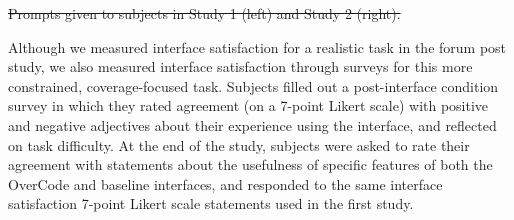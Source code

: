 \documentclass[12pt,twoside]{mitthesis}
\providecommand{\DIFaddtex}[1]{{\protect\color{blue}\uwave{#1}}} %
\providecommand{\DIFdeltex}[1]{{\protect\color{red}\sout{#1}}}                      %
\providecommand{\DIFaddbegin}{} %
\providecommand{\DIFaddend}{} %
\providecommand{\DIFdelbegin}{} %
\providecommand{\DIFdelend}{} %
\providecommand{\DIFdelFL}[1]{\DIFdel{#1}} %
\providecommand{\DIFadd}[1]{\texorpdfstring{\DIFaddtex{#1}}{#1}} %
\providecommand{\DIFdel}[1]{\texorpdfstring{\DIFdeltex{#1}}{}} %
\begin{document}
\DIFdelbegin %
{%
\DIFdelFL{Prompts given to subjects in Study 1 (left) and Study 2 (right).}}

\DIFdelend \DIFaddbegin {\bf \DIFadd{Surveys}} \DIFaddend Although we measured interface satisfaction for a realistic task in the forum post study, we also measured interface satisfaction through surveys for this more constrained, coverage-focused task. Subjects filled out a post-interface condition survey in which they rated agreement (on a 7-point Likert scale) with positive and negative adjectives about their experience using the interface, and reflected on task difficulty. At the end of the study, subjects were asked to rate their agreement with statements about the usefulness of specific features of both the OverCode and baseline interfaces, and responded to the same interface satisfaction 7-point Likert scale statements used in the first study.
\end{document}
